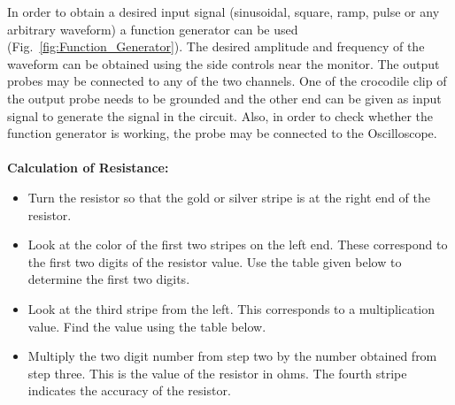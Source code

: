\documentclass[11pt]{scrreprt}
\begin{document}
In order to obtain a desired input signal (sinusoidal, square, ramp, pulse or any arbitrary waveform) a function generator can be used (Fig.~\ref{fig:Function_Generator}). The desired amplitude and frequency of the waveform can be obtained using the side controls near the monitor. The output probes may be connected to any of the two channels. One of the crocodile clip of the output probe needs to be grounded and the other end can be given as input signal to generate the signal in the circuit. Also, in order to check whether the function generator is working, the probe may be connected to the Oscilloscope.\\
\\

\noindent\textbf{Calculation of Resistance:}
\begin{itemize}
\item Turn the resistor so that the gold or silver stripe is at the right end of the resistor.
\item Look at the color of the first two stripes on the left end. These correspond to the first two digits
of the resistor value. Use the table given below to determine the first two digits.
\item Look at the third stripe from the left. This corresponds to a multiplication value. Find the value
using the table below.
\item Multiply the two digit number from step two by the number obtained from step three. This is the
value of the resistor in ohms. The fourth stripe indicates the accuracy of the resistor.
\end{itemize}

\end{document}
